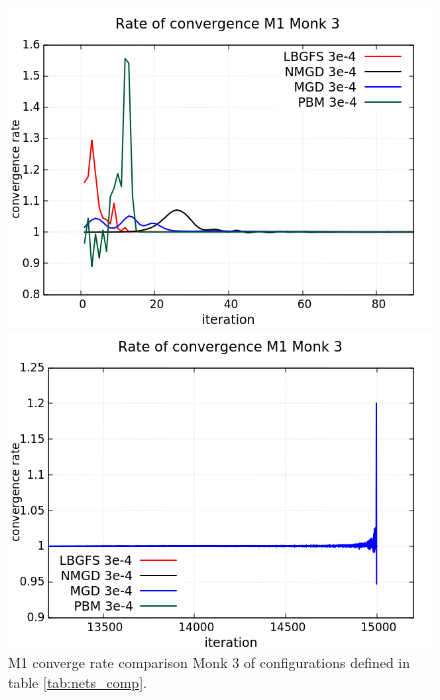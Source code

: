 \begin{figure}[H]
	\centering
	\begin{minipage}[t]{0.525\linewidth}		
		\includegraphics[width=\linewidth]{data/Comparison/Monk3/Monk3_M1_CR_zoomLeft.png}
	\end{minipage}%
	\begin{minipage}[t]{0.525\linewidth}
		\includegraphics[width=\linewidth]{data/Comparison/Monk3/Monk3_M1_CR_zoomRight.png}
	\end{minipage}
	\caption{M1 converge rate comparison Monk 3 of configurations defined in table \ref{tab:nets_comp}.}
	\label{fig:CR-M1-Monk3-Zoom}
\end{figure}

